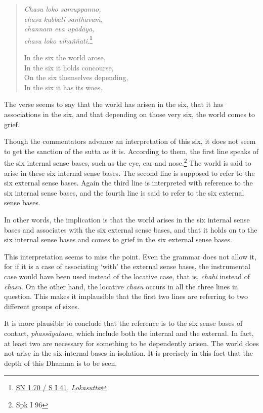 \begin{quote}
\emph{Chasu loko samuppanno,}\\
\emph{chasu kubbati santhavaṁ,}\\
\emph{channam eva upādāya,}\\
\emph{chasu loko vihaññati}.\footnote{\href{https://suttacentral.net/sn1.70/pli/ms}{SN 1.70 / S I 41}, \emph{Lokasutta}}

In the six the world arose,\\
In the six it holds concourse,\\
On the six themselves depending,\\
In the six it has its woes.
\end{quote}

The verse seems to say that the world has arisen in the six, that it has associations in the six, and that depending on those very six, the world comes to grief.

Though the commentators advance an interpretation of this six, it does not seem to get the sanction of the sutta as it is. According to them, the first line speaks of the six internal sense bases, such as the eye, ear and nose.\footnote{Spk I 96} The world is said to arise in these six internal sense bases. The second line is supposed to refer to the six external sense bases. Again the third line is interpreted with reference to the six internal sense bases, and the fourth line is said to refer to the six external sense bases.

In other words, the implication is that the world arises in the six internal sense bases and associates with the six external sense bases, and that it holds on to the six internal sense bases and comes to grief in the six external sense bases.

This interpretation seems to miss the point. Even the grammar does not allow it, for if it is a case of associating `with' the external sense bases, the instrumental case would have been used instead of the locative case, that is, \emph{chahi} instead of \emph{chasu}. On the other hand, the locative \emph{chasu} occurs in all the three lines in question. This makes it implausible that the first two lines are referring to two different groups of sixes.

It is more plausible to conclude that the reference is to the six sense bases of contact, \emph{phassāyatana}, which include both the internal and the external. In fact, at least two are necessary for something to be dependently arisen. The world does not arise in the six internal bases in isolation. It is precisely in this fact that the depth of this Dhamma is to be seen.


